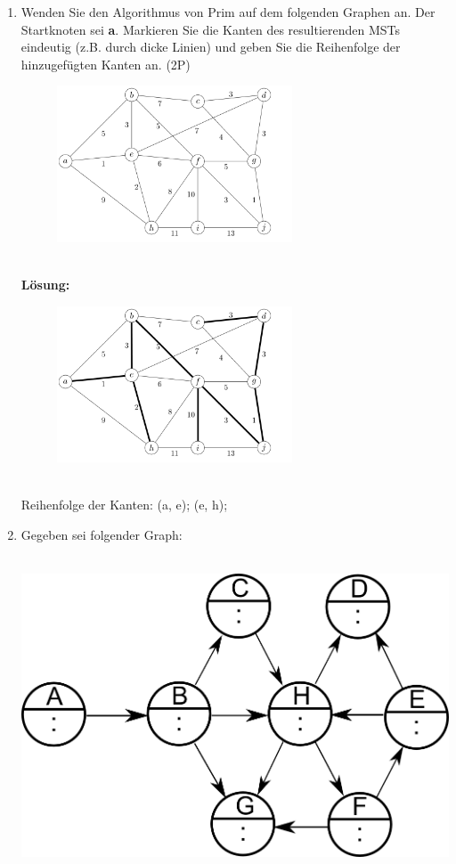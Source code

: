 \documentclass{scrartcl}
\begin{document}
\begin{enumerate}[(1)]
\item Wenden Sie den Algorithmus von Prim auf dem folgenden Graphen an. Der Startknoten sei \textbf{a}. Markieren Sie die Kanten des resultierenden MSTs eindeutig (z.B. durch dicke Linien) und geben Sie die Reihenfolge der hinzugefügten Kanten an. (2P)
\begin{figure}[h]
\centering
\includegraphics[width=0.66\textwidth]{mst_graph.png}
\end{figure}\\
\textbf{Lösung:}\\
\begin{figure}[h]
\centering
\includegraphics[width=0.66\textwidth]{images/mst_loes.png}
\end{figure}\\
Reihenfolge der Kanten: (a, e); (e, h);
\pagebreak
\item Gegeben sei folgender Graph:\\
\ \\
\begin{center}
\includegraphics[width=0.75\linewidth]{images/tiefensuche_aufg}\\

\end{center}
\end{enumerate}
\end{document}
